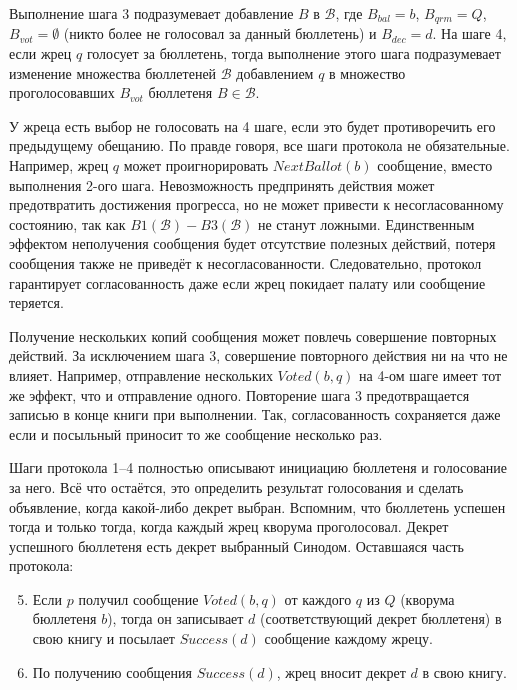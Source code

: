 \documentclass[12pt, a4paper]{article} %
\begin{document}
Выполнение шага 3 подразумевает добавление $B$ в $\mathcal{B}$, где $B_{bal} = b$, $B_{qrm} = Q$, $B_{vot} = \emptyset$ (никто более не голосовал за данный бюллетень) и $B_{dec} = d$. На шаге 4, если жрец $q$ голосует за бюллетень, тогда выполнение этого шага подразумевает изменение множества бюллетеней $\mathcal{B}$ добавлением $q$ в множество проголосовавших $B_{vot}$ бюллетеня $B \in \mathcal{B}$.


У жреца есть выбор не голосовать на 4 шаге, если это будет противоречить его предыдущему обещанию. По правде говоря, все шаги протокола не обязательные. Например, жрец $q$ может проигнорировать $NextBallot(b)$ сообщение, вместо выполнения 2-ого шага. Невозможность предпринять действия может предотвратить достижения прогресса, но не может привести к несогласованному состоянию, так как $B1(\mathcal{B}) - B3(\mathcal{B})$ не станут ложными. Единственным эффектом неполучения сообщения будет отсутствие полезных действий, потеря сообщения также не приведёт к несогласованности. Следовательно, протокол гарантирует согласованность даже если жрец покидает палату или сообщение теряется.

Получение нескольких копий сообщения может повлечь совершение повторных действий. За исключением шага 3, совершение повторного действия ни на что не влияет. Например, отправление нескольких $Voted(b, q)$ на 4-ом шаге имеет тот же эффект, что и отправление одного. Повторение шага 3 предотвращается записью в конце книги при выполнении. Так, согласованность сохраняется даже если и посыльный приносит то же сообщение несколько раз.

Шаги протокола 1--4 полностью описывают инициацию бюллетеня и голосование за него. Всё что остаётся, это определить результат голосования и сделать объявление, когда какой-либо декрет выбран. Вспомним, что бюллетень успешен тогда и только тогда, когда каждый жрец кворума проголосовал. Декрет успешного бюллетеня есть декрет выбранный Синодом. Оставшаяся часть протокола:
\begin{enumerate} \setcounter{enumi}{4}
    \item Если $p$ получил сообщение $Voted(b, q)$ от каждого $q$ из $Q$ (кворума бюллетеня $b$), тогда он записывает $d$ (соответствующий декрет бюллетеня) в свою книгу и посылает $Success(d)$ сообщение каждому жрецу.

    \item По получению сообщения $Success(d)$, жрец вносит декрет $d$ в свою книгу.
\end{enumerate}
\end{document}
